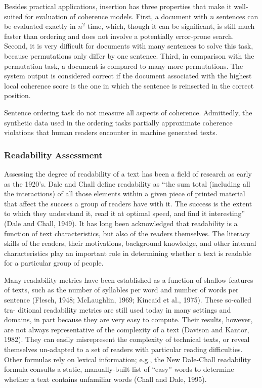 Besides practical applications, insertion has three properties that make it well-suited for evaluation of coherence models. 
First, a document with $n$ sentences can be evaluated exactly in $n^2$ time, which, though it can be significant, is still much faster than ordering and does not involve a potentially error-prone search.
Second, it is very difficult for documents with many sentences to solve this task, because permutations only differ by one sentence.  
Third, in comparison with the permutation task, a document is compared to many more permutations. 
The system output is considered correct if the document associated with the highest local coherence score is the one in which the sentence is reinserted in the correct position. 

Sentence ordering task do not measure all aspects of coherence. 
Admittedly, the synthetic data used in the ordering tasks partially approximate coherence violations that human readers encounter in machine generated texts. 


\subsubsection{Readability Assessment}

Assessing the degree of readability of a text has been a field of research as early as the 1920's. Dale and Chall define readability as “the sum total (including all the interactions) of all those elements within a given piece of printed material that affect the success a group of readers have with it. The success is the extent to which they understand it, read it at optimal speed, and find it interesting” (Dale and Chall, 1949). It has long been acknowledged that readability is a function of text characteristics, but also of the readers themselves. The literacy skills of the readers, their motivations, background knowledge, and other internal characteristics play an important role in determining whether a text is readable for a particular group of people. 

Many readability metrics have been established as a function of shallow features of texts, such as the number of syllables per word and number of words per sentence (Flesch, 1948; McLaughlin, 1969; Kincaid et al., 1975). These so-called tra- ditional readability metrics are still used today in many settings and domains, in part because they are very easy to compute. Their results, however, are not always representative of the complexity of a text (Davison and Kantor, 1982). They can easily misrepresent the complexity of technical texts, or reveal themselves un-adapted to a set of readers with particular reading difficulties. Other formulas rely on lexical information; e.g., the New Dale-Chall readability formula consults a static, manually-built list of “easy” words to determine whether a text contains unfamiliar words (Chall and Dale, 1995).

